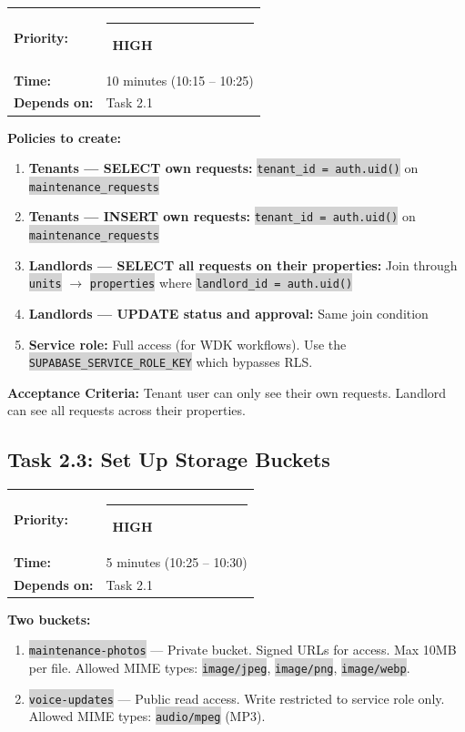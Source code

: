 \documentclass[11pt, a4paper]{article}
\newcommand{\highpri}{\textcolor{highamber}{\rule{6pt}{6pt}}~\textcolor{highamber}{\scriptsize\textbf{HIGH}}}
\newcommand{\code}[1]{\texttt{\small\colorbox{lightgray}{#1}}}
\begin{document}
\begin{tabularx}{\textwidth}{lX}
\textbf{Priority:} & \highpri \\
\textbf{Time:} & 10 minutes (10:15 -- 10:25) \\
\textbf{Depends on:} & Task 2.1 \\
\end{tabularx}

\vspace{0.3em}

\textbf{Policies to create:}
\begin{enumerate}[leftmargin=2em, itemsep=2pt]
  \item \textbf{Tenants --- SELECT own requests:} \code{tenant\_id = auth.uid()} on \code{maintenance\_requests}
  \item \textbf{Tenants --- INSERT own requests:} \code{tenant\_id = auth.uid()} on \code{maintenance\_requests}
  \item \textbf{Landlords --- SELECT all requests on their properties:} Join through \code{units} $\rightarrow$ \code{properties} where \code{landlord\_id = auth.uid()}
  \item \textbf{Landlords --- UPDATE status and approval:} Same join condition
  \item \textbf{Service role:} Full access (for WDK workflows). Use the \code{SUPABASE\_SERVICE\_ROLE\_KEY} which bypasses RLS.
\end{enumerate}

\textbf{Acceptance Criteria:} Tenant user can only see their own requests. Landlord can see all requests across their properties.

\vspace{1em}

\subsection{Task 2.3: Set Up Storage Buckets}

\begin{tabularx}{\textwidth}{lX}
\textbf{Priority:} & \highpri \\
\textbf{Time:} & 5 minutes (10:25 -- 10:30) \\
\textbf{Depends on:} & Task 2.1 \\
\end{tabularx}

\vspace{0.3em}

\textbf{Two buckets:}
\begin{enumerate}[leftmargin=2em, itemsep=2pt]
  \item \code{maintenance-photos} --- Private bucket. Signed URLs for access. Max 10MB per file. Allowed MIME types: \code{image/jpeg}, \code{image/png}, \code{image/webp}.
  \item \code{voice-updates} --- Public read access. Write restricted to service role only. Allowed MIME types: \code{audio/mpeg} (MP3).
\end{enumerate}
\end{document}
